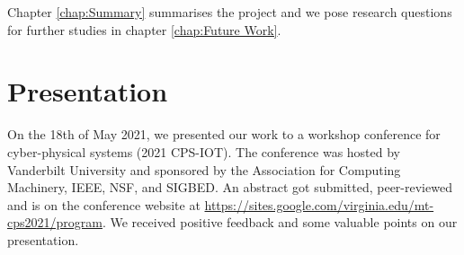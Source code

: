 \noindent Chapter \ref{chap:Summary} summarises the project and we pose research questions for further studies in chapter \ref{chap:Future Work}.

\section{Presentation}

On the 18th of May 2021, we presented our work to a workshop conference for cyber-physical systems (2021 CPS-IOT).  The conference was hosted by Vanderbilt University and sponsored by the Association for Computing Machinery, IEEE, NSF, and SIGBED.  An abstract got submitted, peer-reviewed and is on the conference website at \url{https://sites.google.com/virginia.edu/mt-cps2021/program}.  We received positive feedback and some valuable points on our presentation.